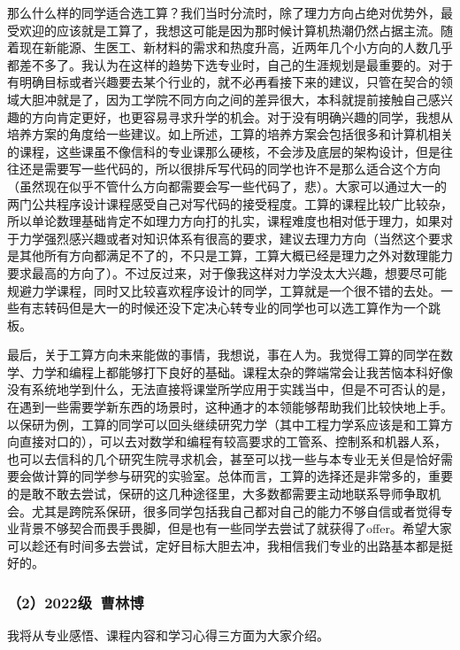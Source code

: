 \documentclass[11pt,oneside]{book}
\begin{document}
那么什么样的同学适合选工算？我们当时分流时，除了理力方向占绝对优势外，最受欢迎的应该就是工算了，我想这可能是因为那时候计算机热潮仍然占据主流。随着现在新能源、生医工、新材料的需求和热度升高，近两年几个小方向的人数几乎都差不多了。我认为在这样的趋势下选专业时，自己的生涯规划是最重要的。对于有明确目标或者兴趣要去某个行业的，就不必再看接下来的建议，只管在契合的领域大胆冲就是了，因为工学院不同方向之间的差异很大，本科就提前接触自己感兴趣的方向肯定更好，也更容易寻求升学的机会。对于没有明确兴趣的同学，我想从培养方案的角度给一些建议。如上所述，工算的培养方案会包括很多和计算机相关的课程，这些课虽不像信科的专业课那么硬核，不会涉及底层的架构设计，但是往往还是需要写一些代码的，所以很排斥写代码的同学也许不是那么适合这个方向（虽然现在似乎不管什么方向都需要会写一些代码了，悲）。大家可以通过大一的两门公共程序设计课程感受自己对写代码的接受程度。工算的课程比较广比较杂，所以单论数理基础肯定不如理力方向打的扎实，课程难度也相对低于理力，如果对于力学强烈感兴趣或者对知识体系有很高的要求，建议去理力方向（当然这个要求是其他所有方向都满足不了的，不只是工算，工算大概已经是理力之外对数理能力要求最高的方向了）。不过反过来，对于像我这样对力学没太大兴趣，想要尽可能规避力学课程，同时又比较喜欢程序设计的同学，工算就是一个很不错的去处。一些有志转码但是大一的时候还没下定决心转专业的同学也可以选工算作为一个跳板。

最后，关于工算方向未来能做的事情，我想说，事在人为。我觉得工算的同学在数学、力学和编程上都能够打下良好的基础。课程太杂的弊端常会让我苦恼本科好像没有系统地学到什么，无法直接将课堂所学应用于实践当中，但是不可否认的是，在遇到一些需要学新东西的场景时，这种通才的本领能够帮助我们比较快地上手。以保研为例，工算的同学可以回头继续研究力学（其中工程力学系应该是和工算方向直接对口的），可以去对数学和编程有较高要求的工管系、控制系和机器人系，也可以去信科的几个研究生院寻求机会，甚至可以找一些与本专业无关但是恰好需要会做计算的同学参与研究的实验室。总体而言，工算的选择还是非常多的，重要的是敢不敢去尝试，保研的这几种途径里，大多数都需要主动地联系导师争取机会。尤其是跨院系保研，很多同学包括我自己都对自己的能力不够自信或者觉得专业背景不够契合而畏手畏脚，但是也有一些同学去尝试了就获得了offer。希望大家可以趁还有时间多去尝试，定好目标大胆去冲，我相信我们专业的出路基本都是挺好的。
\subsubsection{（2）2022级\ 曹林博}

我将从专业感悟、课程内容和学习心得三方面为大家介绍。
\end{document}
